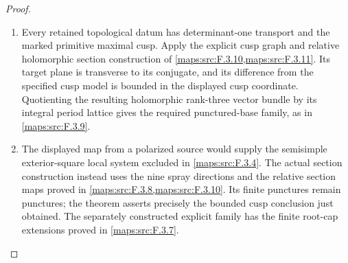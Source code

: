 \begin{proof}
\begin{enumerate}[label=\arabic*.]
\item Every retained topological datum has determinant-one transport
and the marked primitive maximal cusp. Apply the explicit cusp graph
and relative holomorphic section construction of
\cref{maps:src:F.3.10,maps:src:F.3.11}. Its target plane is transverse
to its conjugate, and its difference from the specified cusp model is
bounded in the displayed cusp coordinate. Quotienting the resulting
holomorphic rank-three vector bundle by its integral period lattice
gives the required punctured-base family, as in \cref{maps:src:F.3.9}.
\item The displayed map from a polarized source would supply the
semisimple exterior-square local system excluded in
\cref{maps:src:F.3.4}. The actual section construction instead uses
the nine spray directions and the relative section maps proved in
\cref{maps:src:F.3.8,maps:src:F.3.10}. Its finite punctures remain
punctures; the theorem asserts precisely the bounded cusp conclusion
just obtained. The separately constructed explicit family has the
finite root-cap extensions proved in \cref{maps:src:F.3.7}.
\end{enumerate}
\end{proof}





